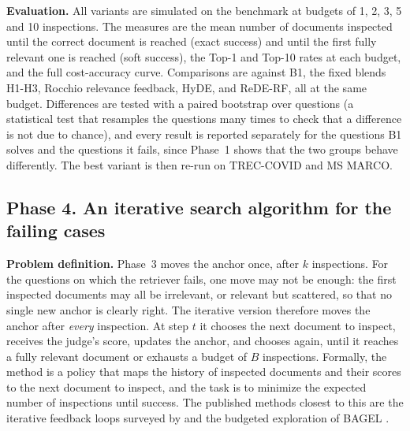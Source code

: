 \documentclass[12pt,a4paper]{article}
\begin{document}
\textbf{Evaluation.} All variants are simulated on the benchmark at budgets of 1, 2, 3, 5 and 10 inspections. The measures are the mean number of documents inspected until the correct document is reached (exact success) and until the first fully relevant one is reached (soft success), the Top-1 and Top-10 rates at each budget, and the full cost-accuracy curve. Comparisons are against B1, the fixed blends H1-H3, Rocchio relevance feedback, HyDE, and ReDE-RF, all at the same budget. Differences are tested with a paired bootstrap over questions (a statistical test that resamples the questions many times to check that a difference is not due to chance), and every result is reported separately for the questions B1 solves and the questions it fails, since Phase~1 shows that the two groups behave differently. The best variant is then re-run on TREC-COVID and MS MARCO.

\subsection{Phase 4. An iterative search algorithm for the failing cases}

\textbf{Problem definition.} Phase~3 moves the anchor once, after $k$ inspections. For the questions on which the retriever fails, one move may not be enough: the first inspected documents may all be irrelevant, or relevant but scattered, so that no single new anchor is clearly right. The iterative version therefore moves the anchor after \emph{every} inspection. At step $t$ it chooses the next document to inspect, receives the judge's score, updates the anchor, and chooses again, until it reaches a fully relevant document or exhausts a budget of $B$ inspections. Formally, the method is a policy that maps the history of inspected documents and their scores to the next document to inspect, and the task is to minimize the expected number of inspections until success. The published methods closest to this are the iterative feedback loops surveyed by \citet{feedback2025survey} and the budgeted exploration of BAGEL \citep{bagel2026}.
\end{document}
